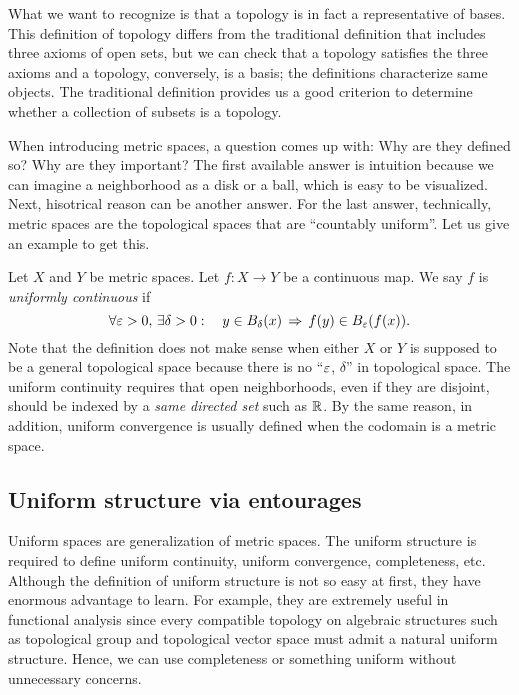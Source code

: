 \documentclass{../exp}
\begin{document}
What we want to recognize is that a topology is in fact a representative of bases.
This definition of topology differs from the traditional definition that includes three axioms of open sets, but we can check that a topology satisfies the three axioms and a topology, conversely, is a basis; the definitions characterize same objects.
The traditional definition provides us a good criterion to determine whether a collection of subsets is a topology.

When introducing metric spaces, a question comes up with: Why are they defined so? Why are they important?
The first available answer is intuition because we can imagine a neighborhood as a disk or a ball, which is easy to be visualized.
Next, hisotrical reason can be another answer.
For the last answer, technically, metric spaces are the topological spaces that are ``countably uniform''.
Let us give an example to get this.
\begin{ex}
Let $X$ and $Y$ be metric spaces.
Let $f\colon X\to Y$ be a continuous map.
We say $f$ is \emph{uniformly continuous} if
\[\forall\varepsilon>0,\,\exists\delta>0:\quad y\in B_\delta(x)\,\Rightarrow\, f(y)\in B_\varepsilon(f(x)).\]
Note that the definition does not make sense when either $X$ or $Y$ is supposed to be a general topological space because there is no ``$\varepsilon$, $\delta$'' in topological space.
The uniform continuity requires that open neighborhoods, even if they are disjoint, should be indexed by a \emph{same directed set} such as $\mathbb{R}$.
By the same reason, in addition, uniform convergence is usually defined when the codomain is a metric space.
\end{ex}


\subsection{Uniform structure via entourages}

Uniform spaces are generalization of metric spaces.
The uniform structure is required to define uniform continuity, uniform convergence, completeness, etc.
Although the definition of uniform structure is not so easy at first, they have enormous advantage to learn.
For example, they are extremely useful in functional analysis since every compatible topology on algebraic structures such as topological group and topological vector space must admit a natural uniform structure.
Hence, we can use completeness or something uniform without unnecessary concerns.
\end{document}
